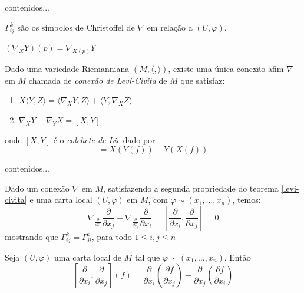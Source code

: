 \begin{demonstracao}
	contenidos...
\end{demonstracao}

\begin{observacao}
	$ \Gamma_{ij}^k $ são os símbolos de Christoffel de $ \nabla $ em relação a $ (U,\varphi) $.
\end{observacao}

\begin{observacao}
	$(\nabla_X Y)(p) = \nabla_{X(p)} Y$
\end{observacao}

\begin{teorema}\label{levi-civita}
	Dado uma variedade Riemanniana $(M,\langle , \rangle)$, existe uma única conexão afim $\nabla$ em $M$ chamada de \emph{conexão de Levi-Civita} de $M$ que satisfaz:
	\begin{enumerate}
		\item $X \langle Y,Z \rangle = \langle \nabla_X Y,Z \rangle + \langle Y, \nabla_X Z\rangle$
		\item $\nabla_X Y - \nabla_Y X = [X,Y]$
	\end{enumerate}
	onde $[X,Y]$ é o \emph{colchete de Lie} dado por
	\begin{equation*}
		[X,Y] = X(Y(f)) - Y(X(f))
	\end{equation*}
\end{teorema}

\begin{demonstracao}
	contenidos...
\end{demonstracao}

\begin{observacao}
	Dado um conexão $\nabla$ em $M$, satisfazendo a segunda propriedade do teorema \ref{levi-civita} e uma carta local $(U,\varphi)$ em $M$, com $\varphi \sim (x_1, \ldots, x_n)$, temos:
	\begin{equation*}
		\nabla_{\frac{\partial}{\partial x_i}} \frac{\partial}{\partial x_j} - \nabla_{\frac{\partial}{\partial x_j}} \frac{\partial}{\partial x_i} = \left[ \frac{\partial}{\partial x_i}, \frac{\partial}{\partial x_j} \right] =0
	\end{equation*}	
	mostrando que $\Gamma_{ij}^k = \Gamma_{ji}^k$, para todo $1 \leq i,j \leq n$
\end{observacao}

\begin{observacao}
	Seja $(U,\varphi)$ uma carta local de $M$ tal que $\varphi \sim (x_1, \ldots,x_n)$. Então
	\begin{equation*}
		\left[\frac{\partial}{\partial x_i},\frac{\partial}{\partial x_j}\right](f) = \frac{\partial}{\partial x_i} \left(\frac{\partial f}{\partial x_j}\right) - \frac{\partial}{\partial x_j} \left(\frac{\partial f}{\partial x_i}\right)
	\end{equation*}
\end{observacao}

